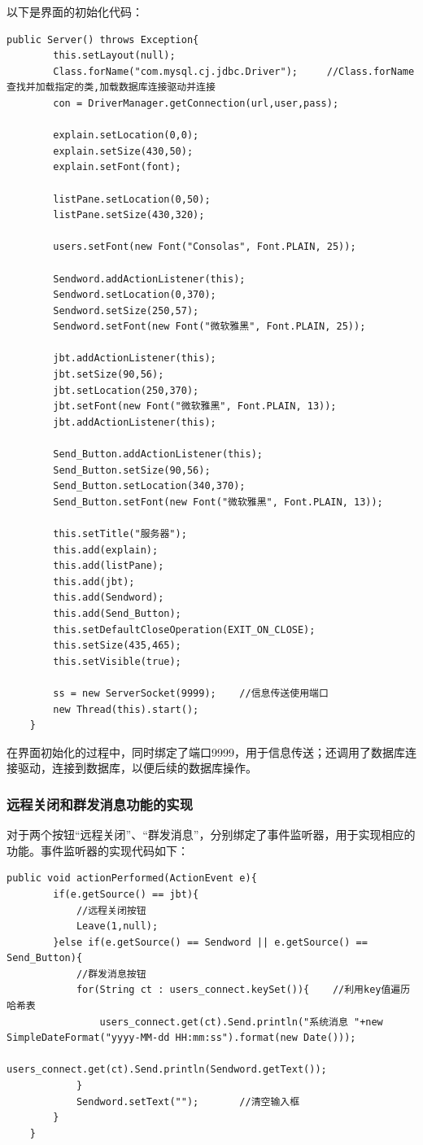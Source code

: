 \documentclass[UTF8,12pt]{article}
\begin{document}
以下是界面的初始化代码：

\begin{lstlisting}[title=服务器界面的初始化,frame=shadowbox]
    public Server() throws Exception{
        this.setLayout(null);
        Class.forName("com.mysql.cj.jdbc.Driver");     //Class.forName查找并加载指定的类,加载数据库连接驱动并连接
        con = DriverManager.getConnection(url,user,pass);

        explain.setLocation(0,0);
        explain.setSize(430,50);
        explain.setFont(font);

        listPane.setLocation(0,50);
        listPane.setSize(430,320);

        users.setFont(new Font("Consolas", Font.PLAIN, 25));

        Sendword.addActionListener(this);
        Sendword.setLocation(0,370);
        Sendword.setSize(250,57);
        Sendword.setFont(new Font("微软雅黑", Font.PLAIN, 25));

        jbt.addActionListener(this);
        jbt.setSize(90,56);
        jbt.setLocation(250,370);
        jbt.setFont(new Font("微软雅黑", Font.PLAIN, 13));
        jbt.addActionListener(this);

        Send_Button.addActionListener(this);
        Send_Button.setSize(90,56);
        Send_Button.setLocation(340,370);
        Send_Button.setFont(new Font("微软雅黑", Font.PLAIN, 13));

        this.setTitle("服务器");
        this.add(explain);
        this.add(listPane);
        this.add(jbt);
        this.add(Sendword);
        this.add(Send_Button);
        this.setDefaultCloseOperation(EXIT_ON_CLOSE);
        this.setSize(435,465);
        this.setVisible(true);

        ss = new ServerSocket(9999);    //信息传送使用端口
        new Thread(this).start();
    }
\end{lstlisting}

在界面初始化的过程中，同时绑定了端口9999，用于信息传送；还调用了数据库连接驱动，连接到数据库，以便后续的数据库操作。

\subsubsection{远程关闭和群发消息功能的实现}

对于两个按钮“远程关闭”、“群发消息”，分别绑定了事件监听器，用于实现相应的功能。事件监听器的实现代码如下：

\begin{lstlisting}[title=事件监听器的实现,frame=shadowbox]
    public void actionPerformed(ActionEvent e){
        if(e.getSource() == jbt){
            //远程关闭按钮
            Leave(1,null);
        }else if(e.getSource() == Sendword || e.getSource() == Send_Button){
            //群发消息按钮
            for(String ct : users_connect.keySet()){    //利用key值遍历哈希表
                users_connect.get(ct).Send.println("系统消息 "+new SimpleDateFormat("yyyy-MM-dd HH:mm:ss").format(new Date()));
                users_connect.get(ct).Send.println(Sendword.getText());
            }
            Sendword.setText("");       //清空输入框
        }
    }
\end{lstlisting}
\end{document}
